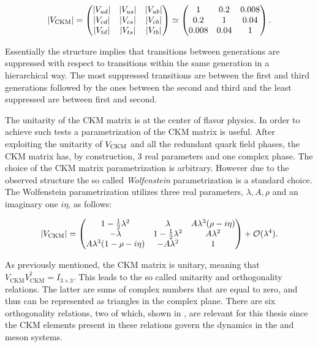 \begin{equation}
  |V_{\text{CKM}}|
                   = \begin{pmatrix} |V_{ud}| & |V_{us}| & |V_{ub}| \\ |V_{cd}| & |V_{cs}| & |V_{cb}| \\ |V_{td}| & |V_{ts}| & |V_{tb}| \end{pmatrix}
              \simeq \begin{pmatrix} 1 & 0.2 & 0.008 \\ 0.2 & 1 & 0.04 \\ 0.008 & 0.04 & 1 \end{pmatrix}.
      \label{CKMmatrix}
  \end{equation}

\noindent Essentially the structure implies that transitions between generations
are suppressed with respect to transitions within the same generation in a hierarchical way. The most suppressed transitions are between
the first and third generations followed by the ones between the second and third and the least suppressed are between first and second.

The unitarity of the CKM matrix is at the center of flavor physics. In order to achieve such tests a
parametrization of the CKM matrix is useful. After exploiting the unitarity of $V_{\rm CKM}$ and all the
redundant quark field phases, the CKM matrix has, by construction, 3 real parameters and one complex phase.
The choice of the CKM matrix parametrization is \aprior arbitrary. However due to the observed structure the so called
{\it Wolfenstein} \cite{Wolfenstein:1983yz,Buras-wolfenstein} parametrization is a standard choice.
The Wolfenstein parametrization utilizes three real parameters, $\lambda,A,\rho$ and an imaginary one $i\eta$, as follows:

\begin{equation}
\centering
  |V_{\text{CKM}}|
                   = \begin{pmatrix} \VudWolf & \VusWolf & \VubWolf \\
                                     \VcdWolf & \VcsWolf & \VcbWolf \\
                                     \VtdWolf & \VtsWolf & \VtbWolf \end{pmatrix} + \mathcal{O}(\lambda^4).
      \label{CKMwolfenstein}
\end{equation}

\noindent As previously mentioned, the CKM matrix is unitary, meaning that $V_{\text{CKM}} V_{\text{CKM}}^\dagger = I_{3\times3}$.
This leads to the so called unitarity and orthogonality relations. The latter are sums of complex numbers that are equal to zero,
and thus can be represented as triangles in the complex plane. There are six orthogonality relations, two of which, shown
in , are relevant for this thesis since the CKM elements present in these relations govern the
dynamics in the \Bs and \Bd meson systems.

